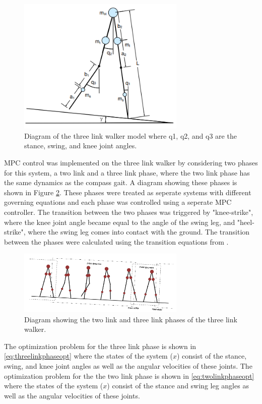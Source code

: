 \documentclass{./springer/svjour3}
\begin{document}
\begin{figure}[!h]
  \centering
  \includegraphics[width=8cm]{./figures/threeleg.png}
  \caption{Diagram of the three link walker model where q1, q2, and q3 are the stance, swing, and knee joint angles.}
  \label{fig:threeleg}
\end{figure}

MPC control was implemented on the three link walker by considering two phases for this system, a two link and a 
three link phase, where the two link phase has the same dynamics as the compass gait. A diagram showing these phases is shown in 
Figure \ref{fig:threelegstates}. These phases were treated as seperate systems with different governing equations and 
each phase was controlled using a seperate MPC controller. The transition between the two phases was triggered by "knee-strike", where the 
knee joint angle became equal to the angle of the swing leg, and "heel-strike", where the swing leg comes into contact with the ground. The 
transition between the phases were calculated using the transition equations from \cite{Chen2007PassiveDW}.
\begin{figure}[!h]
  \centering
  \includegraphics[width=8cm]{./figures/threelegstates.png}
  \caption{Diagram showing the two link and three link phases of the three link walker.}
  \label{fig:threelegstates}
\end{figure}

The optimization problem for the three link phase is shown in \ref{eq:threelinkphaseopt} where the states of the system ($x$) consist of 
the stance, swing, and knee joint angles as well as the angular velocities of these joints. The optimization problem for the the two link phase is 
shown in \ref{eq:twolinkphaseopt} where the states of the system ($x$) consist of the stance and swing leg angles as well as the angular velocities of these joints.
\end{document}

